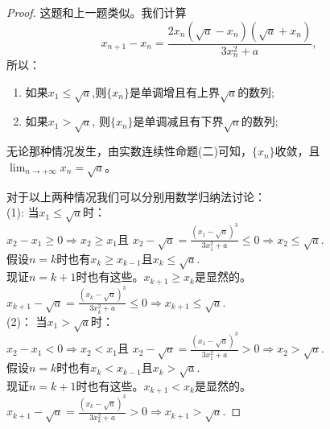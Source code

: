 \documentclass[utf8]{book}
\begin{document}
\begin{proof}这题和上一题类似。我们计算
$$x_{n+1}-x_{n} = \frac{2x_n(\sqrt{a}-x_n)(\sqrt{a}+x_n)}{3x_n^2+a},$$
所以：
\renewcommand\labelenumi{\normalfont(\theenumi)}
\begin{enumerate}
\item 如果$x_1\leq \sqrt{a}$,则$\{x_n\}$是单调增且有上界$\sqrt{a}$的数列;
\item 如果$x_1 > \sqrt{a}$, 则$\{x_n\}$是单调减且有下界$\sqrt{a}$的数列;
\end{enumerate}
无论那种情况发生，由实数连续性命题(二)可知，$\{x_n\}$收敛，且$\displaystyle  \lim_{n\to +\infty}x_n=\sqrt{a}$。

\noindent 对于以上两种情况我们可以分别用数学归纳法讨论：\\
\noindent(1): 当$x_1 \leq \sqrt{a}$时：\\
$x_2 - x_1 \geq 0\Rightarrow x_2 \geq x_1$且
$x_2 - \sqrt{a} = \displaystyle\frac{(x_1-\sqrt{a})^3}{3x_1^2+a} \leq 0\Rightarrow x_2 \leq \sqrt{a}.$\\
假设$n=k$时也有$x_{k}\geq x_{k-1}$且$x_k \leq \sqrt{a}$.\\
现证$n=k+1$时也有这些。$x_{k+1} \geq x_{k}$是显然的。$x_{k+1} - \sqrt{a} = \displaystyle\frac{(x_{k}-\sqrt{a})^3}{3x_k^2+a} \leq 0\Rightarrow x_{k+1} \leq \sqrt{a}.$\\
\noindent(2)： 当$x_1 > \sqrt{a}$时：\\
$x_2 - x_1 < 0\Rightarrow x_2 < x_1$且
$x_2 - \sqrt{a} = \displaystyle\frac{(x_1-\sqrt{a})^3}{3x_1^2+a} > 0\Rightarrow x_2 > \sqrt{a}.$\\
假设$n=k$时也有$x_{k}< x_{k-1}$且$x_k > \sqrt{a}$.\\
现证$n=k+1$时也有这些。$x_{k+1} < x_{k}$是显然的。$x_{k+1} - \sqrt{a} = \displaystyle\frac{(x_{k}-\sqrt{a})^3}{3x_k^2+a} > 0\Rightarrow x_{k+1} > \sqrt{a}.$
\end{proof}
\end{document}
